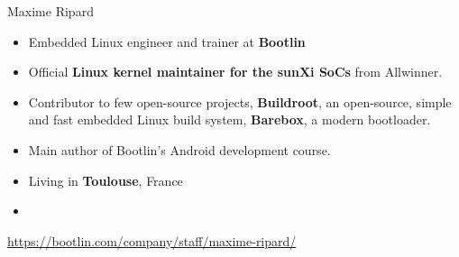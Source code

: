 \begin{frame}{Maxime Ripard}
    \begin{itemize}
	\item Embedded Linux engineer and trainer at {\bf Bootlin}
	\item Official {\bf Linux kernel maintainer for the sunXi SoCs}
	      from Allwinner.
	\item Contributor to few open-source projects, {\bf Buildroot}, an
	      open-source, simple and fast embedded Linux build system,
	     {\bf Barebox}, a modern bootloader.
	\item Main author of Bootlin's Android development course.
	\item Living in {\bf Toulouse}, France
	\item {}
    \end{itemize}
    {\small \url{https://bootlin.com/company/staff/maxime-ripard/}}
\end{frame}
